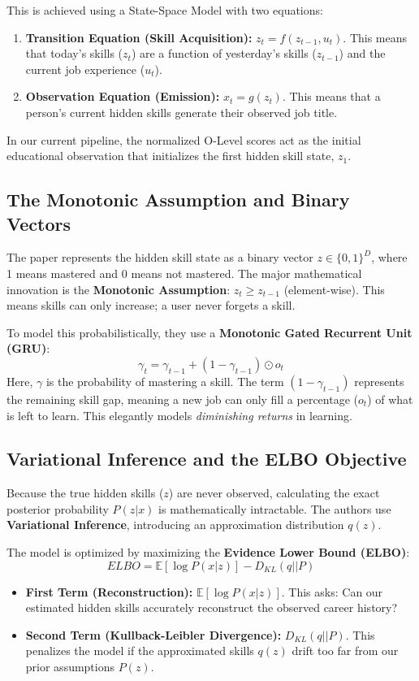 \documentclass[12pt]{article}
\begin{document}
This is achieved using a State-Space Model with two equations:
\begin{enumerate}
    \item \textbf{Transition Equation (Skill Acquisition):} $z_t = f(z_{t-1}, u_t)$. This means that today's skills ($z_t$) are a function of yesterday's skills ($z_{t-1}$) and the current job experience ($u_t$).
    \item \textbf{Observation Equation (Emission):} $x_t = g(z_t)$. This means that a person's current hidden skills generate their observed job title.
\end{enumerate}
In our current pipeline, the normalized O-Level scores act as the initial educational observation that initializes the first hidden skill state, $z_1$.

\subsection{The Monotonic Assumption and Binary Vectors}
The paper represents the hidden skill state as a binary vector $z \in \{0, 1\}^D$, where 1 means mastered and 0 means not mastered. The major mathematical innovation is the \textbf{Monotonic Assumption}: $z_t \ge z_{t-1}$ (element-wise). This means skills can only increase; a user never forgets a skill.

To model this probabilistically, they use a \textbf{Monotonic Gated Recurrent Unit (GRU)}:
\begin{equation}
    \gamma_t = \gamma_{t-1} + (1 - \gamma_{t-1}) \odot o_t
\end{equation}
Here, $\gamma$ is the probability of mastering a skill. The term $(1 - \gamma_{t-1})$ represents the remaining skill gap, meaning a new job can only fill a percentage ($o_t$) of what is left to learn. This elegantly models \textit{diminishing returns} in learning.

\subsection{Variational Inference and the ELBO Objective}
Because the true hidden skills ($z$) are never observed, calculating the exact posterior probability $P(z|x)$ is mathematically intractable. The authors use \textbf{Variational Inference}, introducing an approximation distribution $q(z)$.

The model is optimized by maximizing the \textbf{Evidence Lower Bound (ELBO)}:
\begin{equation}
    ELBO = \mathbb{E}[\log P(x|z)] - D_{KL}(q || P)
\end{equation}
\begin{itemize}
    \item \textbf{First Term (Reconstruction):} $\mathbb{E}[\log P(x|z)]$. This asks: Can our estimated hidden skills accurately reconstruct the observed career history?
    \item \textbf{Second Term (Kullback-Leibler Divergence):} $D_{KL}(q || P)$. This penalizes the model if the approximated skills $q(z)$ drift too far from our prior assumptions $P(z)$.
\end{itemize}
\end{document}
